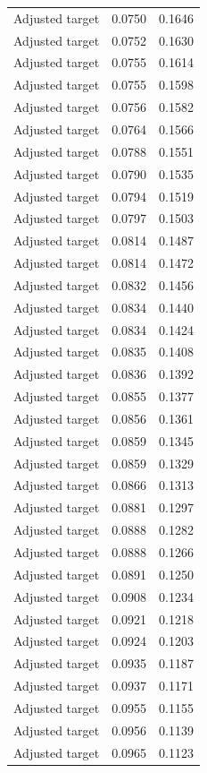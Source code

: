 \begin{table}[htbp]
\begin{tabular}{lll}
Adjusted target & 0.0750 & 0.1646 \\
Adjusted target & 0.0752 & 0.1630 \\
Adjusted target & 0.0755 & 0.1614 \\
Adjusted target & 0.0755 & 0.1598 \\
Adjusted target & 0.0756 & 0.1582 \\
Adjusted target & 0.0764 & 0.1566 \\
Adjusted target & 0.0788 & 0.1551 \\
Adjusted target & 0.0790 & 0.1535 \\
Adjusted target & 0.0794 & 0.1519 \\
Adjusted target & 0.0797 & 0.1503 \\
Adjusted target & 0.0814 & 0.1487 \\
Adjusted target & 0.0814 & 0.1472 \\
Adjusted target & 0.0832 & 0.1456 \\
Adjusted target & 0.0834 & 0.1440 \\
Adjusted target & 0.0834 & 0.1424 \\
Adjusted target & 0.0835 & 0.1408 \\
Adjusted target & 0.0836 & 0.1392 \\
Adjusted target & 0.0855 & 0.1377 \\
Adjusted target & 0.0856 & 0.1361 \\
Adjusted target & 0.0859 & 0.1345 \\
Adjusted target & 0.0859 & 0.1329 \\
Adjusted target & 0.0866 & 0.1313 \\
Adjusted target & 0.0881 & 0.1297 \\
Adjusted target & 0.0888 & 0.1282 \\
Adjusted target & 0.0888 & 0.1266 \\
Adjusted target & 0.0891 & 0.1250 \\
Adjusted target & 0.0908 & 0.1234 \\
Adjusted target & 0.0921 & 0.1218 \\
Adjusted target & 0.0924 & 0.1203 \\
Adjusted target & 0.0935 & 0.1187 \\
Adjusted target & 0.0937 & 0.1171 \\
Adjusted target & 0.0955 & 0.1155 \\
Adjusted target & 0.0956 & 0.1139 \\
Adjusted target & 0.0965 & 0.1123 \\

\end{tabular}
\end{table}
